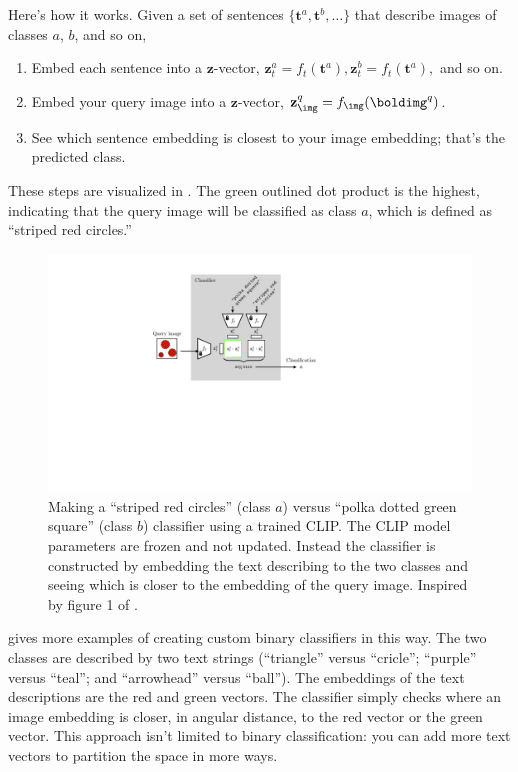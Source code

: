 Here's how it works. Given a set of sentences $\{\mathbf{t}^{a}, \mathbf{t}^{b}, \ldots\}$ that describe images of classes $a$, $b$, and so on,
\begin{enumerate}
    \item Embed each sentence into a $\mathbf{z}$-vector, $\mathbf{z}_t^{a} = f_t(\mathbf{t}^{a}), \mathbf{z}_t^{b} = f_t(\mathbf{t}^{a}),$ and so on.
    \item Embed your query image into a $\mathbf{z}$-vector, $\mathbf{z}_{\img}^{q} = f_{\img}(\boldimg^{q})$.
    \item See which sentence embedding is closest to your image embedding; that's the predicted class.
\end{enumerate}
These steps are visualized in \fig{\ref{fig:vision_and_language:clip_inference}}. The green outlined dot product is the highest, indicating that the query image will be classified as class $a$, which is defined as ``striped red circles.''
\begin{figure}[h]
    \centerline{
        \includegraphics[width=0.75\linewidth]{figures/vision_and_language/clip_inference_fig.pdf}
    }
    \caption{Making a ``striped red circles'' (class $a$) versus ``polka dotted green square'' (class $b$) classifier using a trained CLIP. The CLIP model parameters are frozen and not updated. Instead the classifier is constructed by embedding the text describing to the two classes and seeing which is closer to the embedding of the query image. Inspired by figure 1 of \cite{radford2021learning}.}
    \label{fig:vision_and_language:clip_inference}
\end{figure}
\Fig{\ref{fig:vision_and_language:clip_clocks}} gives more examples of creating custom binary classifiers in this way. The two classes are described by two text strings (``triangle'' versus ``cricle''; ``purple'' versus ``teal''; and ``arrowhead'' versus ``ball''). The embeddings of the text descriptions are the red and green vectors. The classifier simply checks where an image embedding is closer, in angular distance, to the red vector or the green vector. This approach isn't limited to binary classification: you can add more text vectors to partition the space in more ways.

